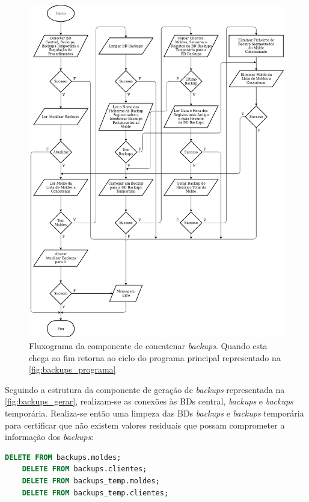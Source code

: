 \documentclass[11pt,twoside,a4paper]{report}
\begin{document}
\begin{figure}
	\begin{center}
		\includegraphics[width=1\textwidth]{fluxograma_backups_concatenar02} %
		\caption[Fluxograma da componente de concatenar \textit{backups}]{Fluxograma da componente de concatenar \textit{backups}. Quando esta chega ao fim retorna ao ciclo do programa principal representado na \autoref{fig:backups_programa}}
		\label{fig:backups_concatenar}
	\end{center}
\end{figure}
\newpage
Seguindo a estrutura da componente de geração de \textit{backups} representada na \autoref{fig:backups_gerar}, realizam-se as conexões às BDs central, \textit{backups} e \textit{backups} temporária. Realiza-se então uma limpeza das BDs \textit{backups} e \textit{backups} temporária para certificar que não existem valores residuais que possam comprometer a informação dos \textit{backups}:
\begin{lstlisting}[language = SQL]
	DELETE FROM backups.moldes;
	DELETE FROM backups.clientes;
	DELETE FROM backups_temp.moldes;
	DELETE FROM backups_temp.clientes;
\end{lstlisting}
\end{document}
